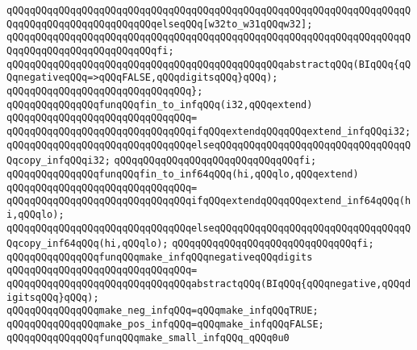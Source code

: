 \verb|qQQqqQQqqQQqqQQqqQQqqQQqqQQqqQQqqQQqqQQqqQQqqQQqqQQqqQQqqQQqqQQqqQQqqQQqqQQqqQQqqQQqqQQqqQQqqQQqelseqQQq[w32to_w31qQQqw32];|\newline
\verb|qQQqqQQqqQQqqQQqqQQqqQQqqQQqqQQqqQQqqQQqqQQqqQQqqQQqqQQqqQQqqQQqqQQqqQQqqQQqqQQqqQQqqQQqqQQqqQQqfi;|\newline
\newline
\verb|qQQqqQQqqQQqqQQqqQQqqQQqqQQqqQQqqQQqqQQqqQQqqQQqabstractqQQq(BIqQQq{qQQqnegativeqQQq=>qQQqFALSE,qQQqdigitsqQQq}qQQq);|\newline
\verb|qQQqqQQqqQQqqQQqqQQqqQQqqQQqqQQq};|\newline
\newline
\verb|qQQqqQQqqQQqqQQqfunqQQqfin_to_infqQQq(i32,qQQqextend)|\newline
\verb|qQQqqQQqqQQqqQQqqQQqqQQqqQQqqQQq=|\newline
\verb|qQQqqQQqqQQqqQQqqQQqqQQqqQQqqQQqifqQQqextendqQQqqQQqextend_infqQQqi32;|\newline
\verb|qQQqqQQqqQQqqQQqqQQqqQQqqQQqqQQqelseqQQqqQQqqQQqqQQqqQQqqQQqqQQqqQQqqQQqcopy_infqQQqi32;|\newline
\verb|qQQqqQQqqQQqqQQqqQQqqQQqqQQqqQQqfi;|\newline
\newline
\verb|qQQqqQQqqQQqqQQqfunqQQqfin_to_inf64qQQq(hi,qQQqlo,qQQqextend)|\newline
\verb|qQQqqQQqqQQqqQQqqQQqqQQqqQQqqQQq=|\newline
\verb|qQQqqQQqqQQqqQQqqQQqqQQqqQQqqQQqifqQQqextendqQQqqQQqextend_inf64qQQq(hi,qQQqlo);|\newline
\verb|qQQqqQQqqQQqqQQqqQQqqQQqqQQqqQQqelseqQQqqQQqqQQqqQQqqQQqqQQqqQQqqQQqqQQqcopy_inf64qQQq(hi,qQQqlo);|\newline
\verb|qQQqqQQqqQQqqQQqqQQqqQQqqQQqqQQqfi;|\newline
\newline
\verb|qQQqqQQqqQQqqQQqfunqQQqmake_infqQQqnegativeqQQqdigits|\newline
\verb|qQQqqQQqqQQqqQQqqQQqqQQqqQQqqQQq=|\newline
\verb|qQQqqQQqqQQqqQQqqQQqqQQqqQQqqQQqabstractqQQq(BIqQQq{qQQqnegative,qQQqdigitsqQQq}qQQq);|\newline
\newline
\verb|qQQqqQQqqQQqqQQqmake_neg_infqQQq=qQQqmake_infqQQqTRUE;|\newline
\verb|qQQqqQQqqQQqqQQqmake_pos_infqQQq=qQQqmake_infqQQqFALSE;|\newline
\newline
\verb|qQQqqQQqqQQqqQQqfunqQQqmake_small_infqQQq_qQQq0u0|\newline
